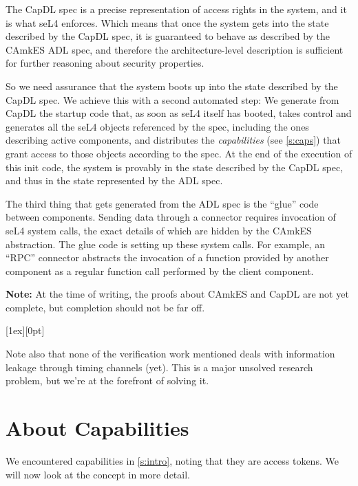 \documentclass[english,a4paper,12pt\ifDraft,draft\fi]{report}
\newcommand{\Sect}[1]{\section{#1}}
\newcommand{\Sect}[1]{\chapter{#1}}
\newlength{\chillilng}\setlength{\chillilng}{8mm}
\newlength{\chillimarg}\setlength{\chillimarg}{10mm}
\newcommand{\chilli}{\texttt{[image: chilli]}}
\newcommand{\chilliItem}{\raisebox{-5mm}[1ex][0pt]{%
      \makebox[\chillilng][r]{\chilli}}}
\newenvironment{Chilli}{
    \begin{list}{}{
      \setlength{\labelwidth}{\chillilng}
      \setlength{\leftmargin}{\chillimarg}}
    \item[\chilliItem]
    }
  {\end{list}}
\begin{document}
  The CapDL spec is a precise representation of access rights in the
  system, and it is what seL4 enforces. Which means that once the
  system gets into the state described by the CapDL spec, it is
  guaranteed to behave as described by the CAmkES ADL spec, and
  therefore the architecture-level description is sufficient for
  further reasoning about security properties.

  So we need assurance that the system boots up into the state
  described by the CapDL spec. We achieve this with a second
  automated step: We generate from CapDL the startup code that, as
  soon as seL4 itself has booted, takes control and generates all the
  seL4 objects referenced by the spec, including the ones describing
  active components, and distributes the \emph{capabilities} (see
  \autoref{s:caps}) that   grant access to those objects according to
  the spec. At the end of the execution of this init code, the system is
  provably in the state described by the CapDL spec, and thus in the
  state represented by the ADL spec.

  The third thing that gets generated from the ADL spec is the
  ``glue'' code between components. Sending data through a
  connector requires invocation of seL4 system calls, the exact
  details of which are hidden by the CAmkES abstraction. The glue code
  is   setting up these system  calls. For example, an ``RPC''
  connector abstracts the invocation of a function provided by another
  component as a regular function call performed by the client
  component.

  \textbf{Note:} At the time of writing, the proofs about CAmkES and
  CapDL are not yet complete, but completion should not be far off.

  \begin{Chilli}
    Note also that none of the verification work mentioned deals with
    information leakage through timing channels (yet). This is a
    major unsolved research problem, but we're at the forefront of
    solving it.
  \end{Chilli}


  \Sect{About Capabilities}\label{s:caps}

  We encountered capabilities in \autoref{s:intro}, noting that they are
  access tokens. We will now look at the concept in more detail.
\end{document}
